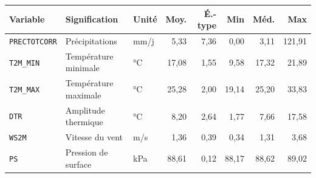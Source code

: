 \footnotesize
\begin{tabular}{lllrrrrr}
\toprule
\rowcolor{NuitBleue!90}
\color{white}\textbf{Variable} & \color{white}\textbf{Signification} & \color{white}\textbf{Unité} & \color{white}\textbf{Moy.} & \color{white}\textbf{É.-type} & \color{white}\textbf{Min} & \color{white}\textbf{Méd.} & \color{white}\textbf{Max} \\
\midrule
\texttt{PRECTOTCORR} & Précipitations & mm/j & 5,33 & 7,36 & 0,00 & 3,11 & 121,91 \\
\texttt{T2M\_MIN} & Température minimale & °C & 17,08 & 1,55 & 9,58 & 17,32 & 21,89 \\
\texttt{T2M\_MAX} & Température maximale & °C & 25,28 & 2,00 & 19,14 & 25,20 & 33,83 \\
\texttt{DTR} & Amplitude thermique & °C & 8,20 & 2,64 & 1,77 & 7,66 & 17,58 \\
\texttt{WS2M} & Vitesse du vent & m/s & 1,36 & 0,39 & 0,34 & 1,31 & 3,68 \\
\texttt{PS} & Pression de surface & kPa & 88,61 & 0,12 & 88,17 & 88,62 & 89,02 \\
\bottomrule
\end{tabular}
